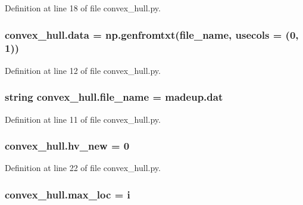 Definition at line 18 of file convex\+\_\+hull.\+py.

\subsubsection[{\texorpdfstring{data}{data}}]{\setlength{\rightskip}{0pt plus 5cm}convex\+\_\+hull.\+data = np.\+genfromtxt({\bf file\+\_\+name}, usecols = (0, 1))}\hypertarget{namespaceconvex__hull_afa0c802ef5d11349c9b0ae812a687963}{}\label{namespaceconvex__hull_afa0c802ef5d11349c9b0ae812a687963}


Definition at line 12 of file convex\+\_\+hull.\+py.

\subsubsection[{\texorpdfstring{file\+\_\+name}{file_name}}]{\setlength{\rightskip}{0pt plus 5cm}string convex\+\_\+hull.\+file\+\_\+name = \textquotesingle{}madeup.\+dat\textquotesingle{}}\hypertarget{namespaceconvex__hull_ad291c7409f15a506c77ae148338af0d1}{}\label{namespaceconvex__hull_ad291c7409f15a506c77ae148338af0d1}


Definition at line 11 of file convex\+\_\+hull.\+py.

\subsubsection[{\texorpdfstring{hv\+\_\+new}{hv_new}}]{\setlength{\rightskip}{0pt plus 5cm}convex\+\_\+hull.\+hv\+\_\+new = 0}\hypertarget{namespaceconvex__hull_af248f2a2b3bdf6275178a4d6003241a4}{}\label{namespaceconvex__hull_af248f2a2b3bdf6275178a4d6003241a4}


Definition at line 22 of file convex\+\_\+hull.\+py.

\subsubsection[{\texorpdfstring{max\+\_\+loc}{max_loc}}]{\setlength{\rightskip}{0pt plus 5cm}convex\+\_\+hull.\+max\+\_\+loc = i}\hypertarget{namespaceconvex__hull_a8e865a90a6ebc2332e166f698bb2b889}{}\label{namespaceconvex__hull_a8e865a90a6ebc2332e166f698bb2b889}


